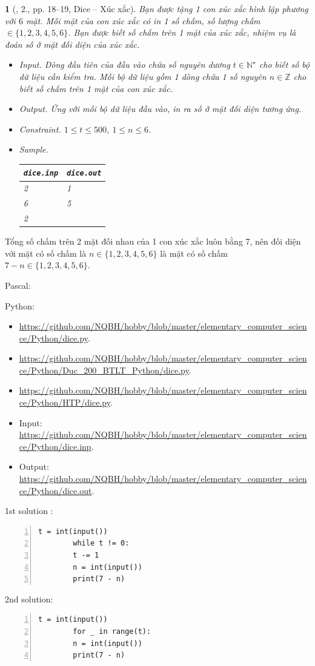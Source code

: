 \documentclass{article}
\newtheorem{baitoan}{}
\begin{document}
\begin{baitoan}[\cite{Duc_200_BT_Python}, 2., pp. 18--19, Dice -- Xúc xắc]
	Bạn được tặng 1 con xúc xắc hình lập phương với $6$ mặt. Mỗi mặt của con xúc xắc có in 1 số chấm, số lượng chấm $\in\{1,2,3,4,5,6\}$. Bạn được biết số chấm trên 1 mặt của xúc xắc, nhiệm vụ là đoán số ở mặt đối diện của xúc xắc.
	\begin{itemize}
		\item {\sf Input.} Dòng đầu tiên của đầu vào chứa số nguyên dương $t\in\mathbb{N}^\star$ cho biết số bộ dữ liệu cần kiểm tra. Mỗi bộ dữ liệu gồm 1 dòng chứa 1 số nguyên $n\in\mathbb{Z}$ cho biết số chấm trên 1 mặt của con xúc xắc.
		\item {\sf Output.} Ứng với mỗi bộ dữ liệu đầu vào, in ra số ở mặt đối diện tương ứng.
		\item {\sf Constraint.} $1\le t\le500$, $1\le n\le6$.
		\item {\sf Sample.}
		\begin{table}[H]
			\centering
			\begin{tabular}{|l|l|}
				\hline
				{\tt dice.inp} & {\tt dice.out} \\
				\hline
				2 & 1 \\
				6 & 5 \\
				2 &  \\
				\hline
			\end{tabular}
		\end{table}
	\end{itemize}
\end{baitoan}
Tổng số chấm trên 2 mặt đối nhau của 1 con xúc xắc luôn bằng 7, nên đối diện với mặt có số chấm là $n\in\{1,2,3,4,5,6\}$ là mặt có số chấm $7 - n\in\{1,2,3,4,5,6\}$.

Pascal:

Python:
\begin{itemize}
	\item \url{https://github.com/NQBH/hobby/blob/master/elementary_computer_science/Python/dice.py}.
	\item \url{https://github.com/NQBH/hobby/blob/master/elementary_computer_science/Python/Duc_200_BTLT_Python/dice.py}.
	\item \url{https://github.com/NQBH/hobby/blob/master/elementary_computer_science/Python/HTP/dice.py}.
	\item Input: \url{https://github.com/NQBH/hobby/blob/master/elementary_computer_science/Python/dice.inp}.
	\item Output: \url{https://github.com/NQBH/hobby/blob/master/elementary_computer_science/Python/dice.out}.
\end{itemize}
\begin{multicols}{2}
	1st solution \cite[p. 202--203]{Duc_200_BT_Python}:
	\begin{Verbatim}[numbers=left,xleftmargin=5mm]
		t = int(input())
		while t != 0:
		t -= 1
		n = int(input())
		print(7 - n)
	\end{Verbatim}
	\columnbreak
	2nd solution:
	\begin{Verbatim}[numbers=left,xleftmargin=5mm]
		t = int(input())
		for _ in range(t):
		n = int(input())
		print(7 - n)
	\end{Verbatim}
\end{multicols}
\end{document}
